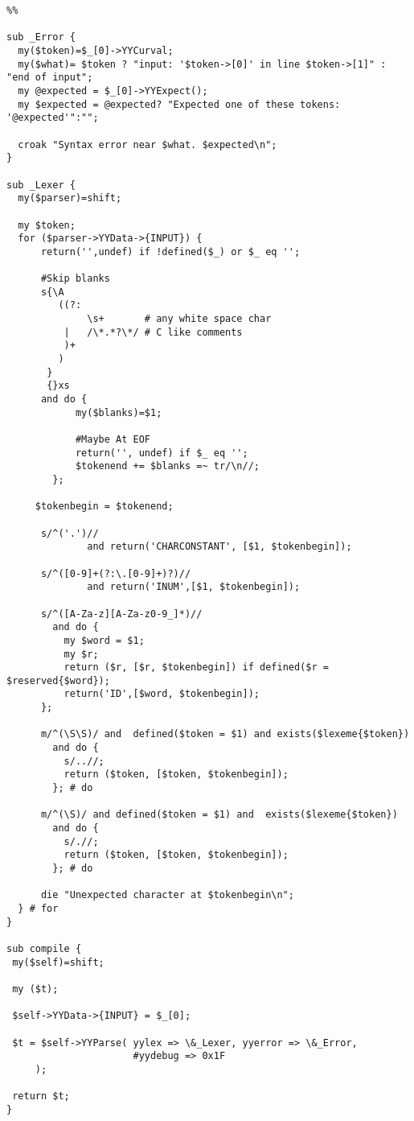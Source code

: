 \begin{verbatim}
%%

sub _Error {
  my($token)=$_[0]->YYCurval;
  my($what)= $token ? "input: '$token->[0]' in line $token->[1]" : "end of input";
  my @expected = $_[0]->YYExpect();
  my $expected = @expected? "Expected one of these tokens: '@expected'":"";

  croak "Syntax error near $what. $expected\n";
}

sub _Lexer {
  my($parser)=shift;

  my $token;
  for ($parser->YYData->{INPUT}) {
      return('',undef) if !defined($_) or $_ eq '';

      #Skip blanks
      s{\A
         ((?:
              \s+       # any white space char
          |   /\*.*?\*/ # C like comments
          )+
         )
       }
       {}xs
      and do {
            my($blanks)=$1;

            #Maybe At EOF
            return('', undef) if $_ eq '';
            $tokenend += $blanks =~ tr/\n//;
        };

     $tokenbegin = $tokenend;

      s/^('.')//
              and return('CHARCONSTANT', [$1, $tokenbegin]);

      s/^([0-9]+(?:\.[0-9]+)?)//
              and return('INUM',[$1, $tokenbegin]);

      s/^([A-Za-z][A-Za-z0-9_]*)//
        and do {
          my $word = $1;
          my $r;
          return ($r, [$r, $tokenbegin]) if defined($r = $reserved{$word});
          return('ID',[$word, $tokenbegin]);
      };

      m/^(\S\S)/ and  defined($token = $1) and exists($lexeme{$token})
        and do {
          s/..//;
          return ($token, [$token, $tokenbegin]);
        }; # do

      m/^(\S)/ and defined($token = $1) and  exists($lexeme{$token})
        and do {
          s/.//;
          return ($token, [$token, $tokenbegin]);
        }; # do
      
      die "Unexpected character at $tokenbegin\n";
  } # for
}

sub compile {
 my($self)=shift;

 my ($t);
   
 $self->YYData->{INPUT} = $_[0];

 $t = $self->YYParse( yylex => \&_Lexer, yyerror => \&_Error, 
                      #yydebug => 0x1F 
     );

 return $t;
}


\end{verbatim}
